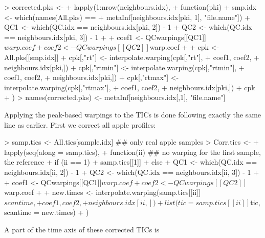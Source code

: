 \documentclass[a4paper,11pt]{article}
\begin{document}
\begin{Schunk}
\begin{Sinput}
> corrected.pks <- 
+   lapply(1:nrow(neighbours.idx),
+          function(pki) {
+            smp.idx <- which(names(All.pks) == 
+                                 metaInf[neighbours.idx[pki, 1], "file.name"])
+            QC1 <- which(QC.idx == neighbours.idx[pki, 2]) - 1
+            QC2 <- which(QC.idx == neighbours.idx[pki, 3]) - 1
+            
+            coef1 <- QCwarpings[[QC1]]$warp.coef
+            coef2 <- QCwarpings[[QC2]]$warp.coef
+            
+            cpk <- All.pks[[smp.idx]]
+            cpk[,"rt"] <- interpolate.warping(cpk[,"rt"],
+                                              coef1, coef2,
+                                              neighbours.idx[pki,])
+            cpk[,"rtmin"] <- interpolate.warping(cpk[,"rtmin"],
+                                                 coef1, coef2,
+                                                 neighbours.idx[pki,])
+            cpk[,"rtmax"] <- interpolate.warping(cpk[,"rtmax"],
+                                                 coef1, coef2,
+                                                 neighbours.idx[pki,])
+            cpk
+          })
> names(corrected.pks) <- metaInf[neighbours.idx[,1], "file.name"]
\end{Sinput}
\end{Schunk}
Applying the peak-based warpings to the TICs is done following exactly
the same line as earlier. First we correct all apple profiles:
\begin{Schunk}
\begin{Sinput}
> samp.tics <- All.tics[sample.idx] ## only real apple samples
> Corr.tics <- 
+   lapply(seq(along = samp.tics),
+          function(ii) { ## no warping for the first sample, the reference
+            if (ii == 1) {
+              samp.tics[[1]] 
+            } else {
+              QC1 <- which(QC.idx == neighbours.idx[ii, 2]) - 1
+              QC2 <- which(QC.idx == neighbours.idx[ii, 3]) - 1
+              
+              coef1 <- QCwarpings[[QC1]]$warp.coef
+              coef2 <- QCwarpings[[QC2]]$warp.coef
+ 
+              new.times <- interpolate.warping(samp.tics[[ii]]$scantime, 
+                                               coef1, coef2, 
+                                               neighbours.idx[ii,])
+              list(tic = samp.tics[[ii]]$tic, scantime = new.times)
+            }})
\end{Sinput}
\end{Schunk}
A part of the time axis of these corrected TICs is
\end{document}

